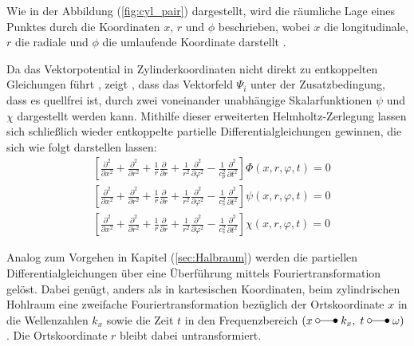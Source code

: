 Wie in der Abbildung (\ref{fig:cyl_pair}) dargestellt, wird die räumliche Lage eines Punktes durch die Koordinaten $x$, $r$ und $\phi$ beschrieben, wobei \(x\) die longitudinale, \(r\) die radiale und \(\phi\) die umlaufende Koordinate darstellt \cite{Freisinger2022}.


Da das Vektorpotential in Zylinderkoordinaten nicht direkt zu entkoppelten Gleichungen führt \citep{Hackenberg2016}, zeigt \cite{Fruehe2010}, dass das Vektorfeld $\Psi_{i}$ unter der Zusatzbedingung, dass es quellfrei ist, durch zwei voneinander unabhängige Skalarfunktionen $\psi$ und $\chi$ dargestellt werden kann.
Mithilfe dieser erweiterten Helmholtz-Zerlegung lassen sich schließlich wieder entkoppelte partielle Differentialgleichungen gewinnen, die sich wie folgt darstellen lassen:
\begin{subequations}\label{eq:cyl_wave}
	{
		\begin{align}
			&\left[\frac{\partial^{2}}{\partial x^{2}}
			+ \frac{\partial^{2}}{\partial r^{2}}
			+ \frac{1}{r}\frac{\partial}{\partial r}
			+ \frac{1}{r^{2}}\frac{\partial^{2}}{\partial \varphi^{2}}
			- \frac{1}{c_p^{2}}\frac{\partial^{2}}{\partial t^{2}}\right]
			\Phi(x,r,\varphi,t)=0 \label{eq:cyl_phi}\\[6pt]
			&\left[\frac{\partial^{2}}{\partial x^{2}}
			+ \frac{\partial^{2}}{\partial r^{2}}
			+ \frac{1}{r}\frac{\partial}{\partial r}
			+ \frac{1}{r^{2}}\frac{\partial^{2}}{\partial \varphi^{2}}
			- \frac{1}{c_s^{2}}\frac{\partial^{2}}{\partial t^{2}}\right]
			\psi(x,r,\varphi,t)=0 \label{eq:cyl_psi}\\[6pt]
			&\left[\frac{\partial^{2}}{\partial x^{2}}
			+ \frac{\partial^{2}}{\partial r^{2}}
			+ \frac{1}{r}\frac{\partial}{\partial r}
			+ \frac{1}{r^{2}}\frac{\partial^{2}}{\partial \varphi^{2}}
			- \frac{1}{c_s^{2}}\frac{\partial^{2}}{\partial t^{2}}\right]
			\chi(x,r,\varphi,t)=0 \label{eq:cyl_chi}
		\end{align}
	}%
\end{subequations}


Analog zum Vorgehen in Kapitel (\ref{sec:Halbraum}) werden die partiellen Differentialgleichungen über eine Überführung mittels Fouriertransformation gelöst. Dabei genügt, anders als in kartesischen Koordinaten, beim zylindrischen Hohlraum
eine zweifache Fouriertransformation bezüglich der Ortskoordinate $x$ in die Wellenzahlen $k_{x}$
sowie die Zeit $t$ in den Frequenzbereich \((x \mapto k_x,\; t \mapto \omega)\). 
Die Ortskoordinate $r$ bleibt dabei untransformiert.

